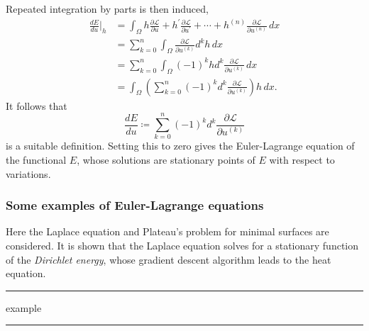 \documentclass{article}
\newcommand{\fancyL}{\mathcal{L}}
\newcommand{\om}{\Omega}
\newcommand{\pom}{{\partial\Omega}}
\newcommand{\diver}{\text{div}}
\newcommand{\todo}[1]{\vskip 0.1in \hrule \vskip 0.03in {#1} \vskip 0.03in \hrule \vskip 0.1in}
\begin{document}
Repeated integration by parts is then induced,
\begin{align*}
    \frac{dE}{du}\Big|_h &=
        \int_\Omega h\frac{\partial\mathcal{L}}{\partial u}
            + h^\prime\frac{\partial\fancyL}{\partial u^\prime}
            + \cdots
            + h^{(n)}\frac{\partial\fancyL}{\partial u^{(n)}}\,dx \\
    &= \sum_{k=0}^n \int_\om \frac{\partial\mathcal L}{\partial u^{(k)}} d^k h \,dx \\
    &= \sum_{k=0}^n \int_\om (-1)^k h d^k \frac{\partial\mathcal L}{\partial u^{(k)}}\,dx \\
    &= \int_\om \left(\sum_{k=0}^n (-1)^k d^k \frac{\partial\mathcal L}{\partial u^{(k)}}\right)h\,dx.
\end{align*}
It follows that
\begin{equation}\label{functional_gradient_zero_boundary}
    \frac{dE}{du} \coloneqq \sum_{k=0}^n (-1)^k d^k \frac{\partial\mathcal L}{\partial u^{(k)}}
\end{equation}
is a suitable definition. Setting this to zero gives the Euler-Lagrange equation of the functional $E$,
whose solutions are stationary points of $E$ with respect to variations.




\subsubsection{Some examples of Euler-Lagrange equations}
Here the Laplace equation and Plateau's problem for minimal surfaces are considered.
It is shown that the Laplace equation solves for a stationary function of the \textit{Dirichlet energy},
whose gradient descent algorithm leads to the heat equation.
\todo{example}
\end{document}
